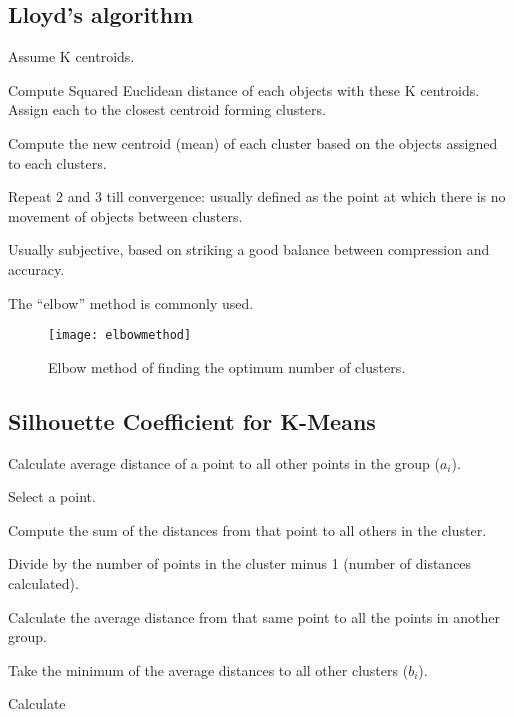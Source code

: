 	\subsection{Lloyd's algorithm}

	\begin{numberedlist}
		\item Assume K centroids.
		\item Compute Squared Euclidean distance of each objects with these K centroids. Assign each to the closest centroid forming clusters.
		\item Compute the new centroid (mean) of each cluster based on the objects assigned to each clusters.
		\item Repeat 2 and 3 till convergence: usually defined as the point at which there is no movement of objects between clusters.
	\end{numberedlist}

	\begin{bulletedlist}
		\item Usually subjective, based on striking a good balance between compression and accuracy.
		\item The ``elbow'' method is commonly used.
	\end{bulletedlist}

	\begin{figure}[htb]
		\centering
		\texttt{[image: elbowmethod]}
		\caption[Elbow method of finding the optimum number of clusters]{Elbow method of finding the optimum number of clusters.}
		\label{fig:elbowmethod}
	\end{figure}

	\subsection{Silhouette Coefficient for K-Means}
	\begin{numberedlist}
		\item Calculate average distance of a point to all other points in the group ($a_i$).
			\begin{numberedlist}
				\item Select a point.
				\item Compute the sum of the distances from that point to all others in the cluster.
				\item Divide by the number of points in the cluster minus 1 (number of distances calculated).
			\end{numberedlist}
		\item Calculate the average distance from that same point to all the points in another group.
		\item Take the minimum of the average distances to all other clusters ($b_i$).
		\item Calculate
	\end{numberedlist}

